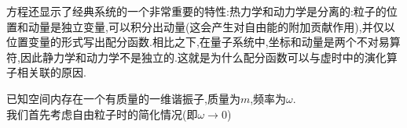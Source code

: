 方程还显示了经典系统的一个非常重要的特性:热力学和动力学是分离的:粒子的位置和动量是独立变量,可以积分出动量(这会产生对自由能的附加贡献作用),并仅以位置变量的形式写出配分函数.相比之下,在量子系统中,坐标和动量是两个不对易算符,因此静力学和动力学不是独立的.这就是为什么配分函数可以与虚时中的演化算子相关联的原因.

\begin{eggg}
	
	{\Large 已知空间内存在一个有质量的一维谐振子,质量为$ m $,频率为$\omega$.}\\
	我们首先考虑自由粒子时的简化情况(即$\omega\to0$)
\end{eggg}






































































































	
\ifx\allfiles\undefined

	\else
	\fi

